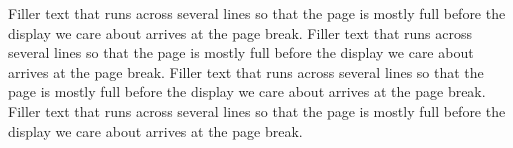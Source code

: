 \documentclass[10pt]{article}
\begin{document}
Filler text that runs across several lines so that the page is mostly full before the display we care about arrives at the page break. Filler text that runs across several lines so that the page is mostly full before the display we care about arrives at the page break. Filler text that runs across several lines so that the page is mostly full before the display we care about arrives at the page break. Filler text that runs across several lines so that the page is mostly full before the display we care about arrives at the page break.
\end{document}

